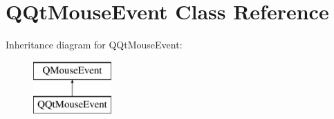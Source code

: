 \hypertarget{class_q_qt_mouse_event}{}\section{Q\+Qt\+Mouse\+Event Class Reference}
\label{class_q_qt_mouse_event}
Inheritance diagram for Q\+Qt\+Mouse\+Event\+:\begin{figure}[H]
\begin{center}
\leavevmode
\includegraphics[height=2.000000cm]{class_q_qt_mouse_event}
\end{center}
\end{figure}
